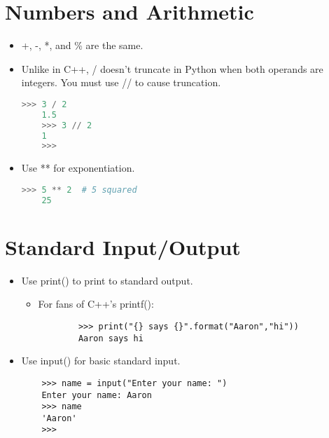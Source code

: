 \documentclass{article}
\begin{document}
\section{Numbers and Arithmetic}
\begin{itemize}
    \item +, -, *, and \% are the same.
    \item Unlike in C++, / doesn't truncate in Python when both operands are integers. You must use // to cause truncation.
    \begin{lstlisting}[language=Python]
    >>> 3 / 2
    1.5
    >>> 3 // 2
    1
    >>>
    \end{lstlisting}
    \item Use ** for exponentiation.
    \begin{lstlisting}[language=Python]
    >>> 5 ** 2  # 5 squared
    25
    \end{lstlisting}

\end{itemize}

\section{Standard Input/Output}
\begin{itemize}
    \item Use print() to print to standard output.
        \begin{itemize}
        \item For fans of C++'s printf():
        \begin{lstlisting}
        >>> print("{} says {}".format("Aaron","hi"))
        Aaron says hi
        \end{lstlisting}
        \end{itemize}
    \item Use input() for basic standard input.
    \begin{lstlisting}
    >>> name = input("Enter your name: ")
    Enter your name: Aaron
    >>> name
    'Aaron'
    >>>
    \end{lstlisting}
\end{itemize}
\end{document}
